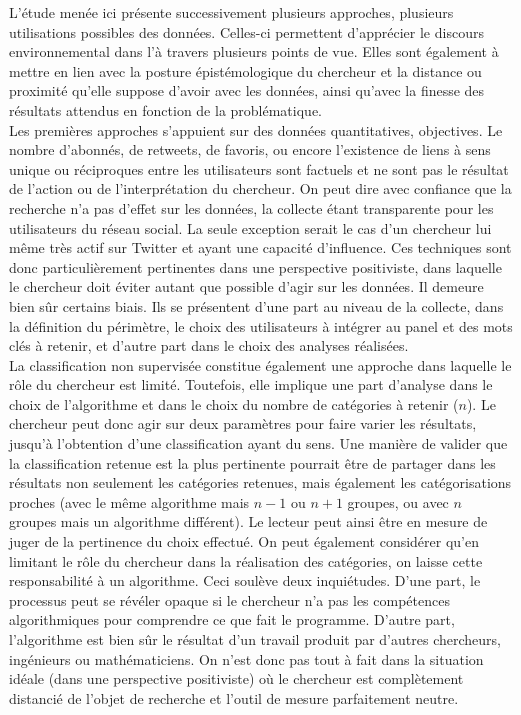         L'étude menée ici présente successivement plusieurs approches, plusieurs utilisations possibles des données. Celles-ci permettent d'apprécier le discours environnemental dans l'\ess à travers plusieurs points de vue. Elles sont également à mettre en lien avec la posture épistémologique du chercheur et la distance ou proximité qu'elle suppose d'avoir avec les données, ainsi qu'avec la finesse des résultats attendus en fonction de la problématique. \\

        Les premières approches s'appuient sur des données quantitatives, objectives. Le nombre d'abonnés, de retweets, de favoris, ou encore l'existence de liens à sens unique ou réciproques entre les utilisateurs sont factuels et ne sont pas le résultat de l'action ou de l'interprétation du chercheur. On peut dire avec confiance que la recherche n'a pas d'effet sur les données, la collecte étant transparente pour les utilisateurs du réseau social. La seule exception serait le cas d'un chercheur lui même très actif sur Twitter et ayant une capacité d'influence. Ces techniques sont donc particulièrement pertinentes dans une perspective positiviste, dans laquelle le chercheur doit éviter autant que possible d'agir sur les données. Il demeure bien sûr certains biais. Ils se présentent d'une part au niveau de la collecte, dans la définition du périmètre, le choix des utilisateurs à intégrer au panel et des mots clés à retenir, et d'autre part dans le choix des analyses réalisées. \\

        La classification non supervisée constitue également une approche dans laquelle le rôle du chercheur est limité. Toutefois, elle implique une part d'analyse dans le choix de l'algorithme et dans le choix du nombre de catégories à retenir ($n$). Le chercheur peut donc agir sur deux paramètres pour faire varier les résultats, jusqu'à l'obtention d'une classification ayant du sens. Une manière de valider que la classification retenue est la plus pertinente pourrait être de partager dans les résultats non seulement les catégories retenues, mais également les catégorisations proches (avec le même algorithme mais $n-1$ ou $n+1$ groupes, ou avec $n$ groupes mais un algorithme différent). Le lecteur peut ainsi être en mesure de juger de la pertinence du choix effectué. On peut également considérer qu'en limitant le rôle du chercheur dans la réalisation des catégories, on laisse cette responsabilité à un algorithme. Ceci soulève deux inquiétudes. D'une part, le processus peut se révéler opaque si le chercheur n'a pas les compétences algorithmiques pour comprendre ce que fait le programme. D'autre part, l'algorithme est bien sûr le résultat d'un travail produit par d'autres chercheurs, ingénieurs ou mathématiciens. On n'est donc pas tout à fait dans la situation idéale (dans une perspective positiviste) où le chercheur est complètement distancié de l'objet de recherche et l'outil de mesure parfaitement neutre. \\

